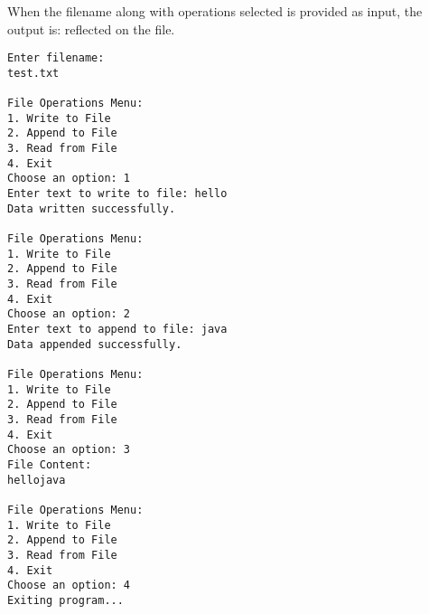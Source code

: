 When the filename along with operations selected is provided as input, the output is: reflected on the file.
\begin{verbatim}
Enter filename:
test.txt

File Operations Menu:
1. Write to File
2. Append to File
3. Read from File
4. Exit
Choose an option: 1
Enter text to write to file: hello
Data written successfully.

File Operations Menu:
1. Write to File
2. Append to File
3. Read from File
4. Exit
Choose an option: 2
Enter text to append to file: java
Data appended successfully.

File Operations Menu:
1. Write to File
2. Append to File
3. Read from File
4. Exit
Choose an option: 3
File Content:
hellojava

File Operations Menu:
1. Write to File
2. Append to File
3. Read from File
4. Exit
Choose an option: 4
Exiting program...

\end{verbatim}

